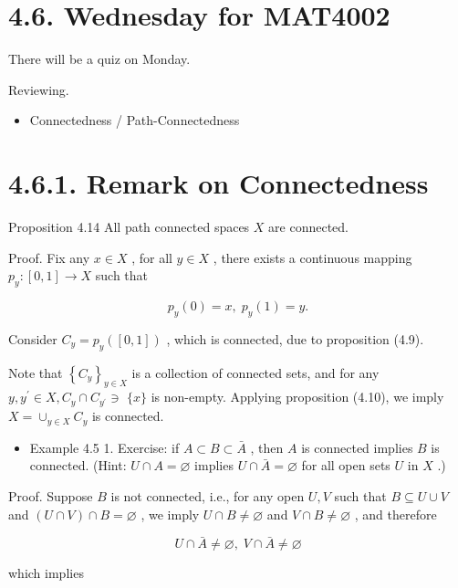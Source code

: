 \section*{4.6. Wednesday for MAT4002}

There will be a quiz on Monday.

Reviewing.

\begin{itemize}
\item Connectedness / Path-Connectedness
\end{itemize}

\section*{4.6.1. Remark on Connectedness}

Proposition 4.14 All path connected spaces \(X\) are connected.

Proof. Fix any \(x \in  X\) , for all \(y \in  X\) , there exists a continuous mapping \({p}_{y} : \left\lbrack  {0,1}\right\rbrack   \rightarrow  X\) such that

\[
{p}_{y}\left( 0\right)  = x,\;{p}_{y}\left( 1\right)  = y.
\]

Consider \({C}_{y} = {p}_{y}\left( \left\lbrack  {0,1}\right\rbrack  \right)\) , which is connected, due to proposition (4.9).

Note that \({\left\{  {C}_{y}\right\}  }_{y \in  X}\) is a collection of connected sets, and for any \(y,{y}^{\prime } \in  X,{C}_{y} \cap  {C}_{{y}^{\prime }} \ni\)  \(\{ x\}\) is non-empty. Applying proposition (4.10), we imply \(X = { \cup  }_{y \in  X}{C}_{y}\) is connected.

\begin{itemize}
\item Example 4.5 1. Exercise: if \(A \subset  B \subset  \bar{A}\) , then \(A\) is connected implies \(B\) is connected. (Hint: \(U \cap  A = \varnothing\) implies \(U \cap  \bar{A} = \varnothing\) for all open sets \(U\) in \(X\) .)
\end{itemize}

Proof. Suppose \(B\) is not connected, i.e., for any open \(U,V\) such that \(B \subseteq  U \cup  V\) and \(\left( {U \cap  V}\right)  \cap  B = \varnothing\) , we imply \(U \cap  B \neq  \varnothing\) and \(V \cap  B \neq  \varnothing\) , and therefore

\[
U \cap  \bar{A} \neq  \varnothing ,\;V \cap  \bar{A} \neq  \varnothing
\]

which implies

